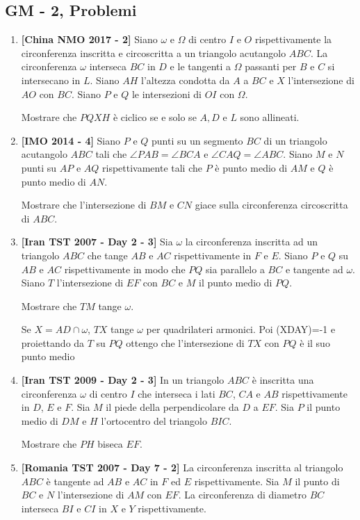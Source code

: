 \subsection{GM - 2, Problemi}
\begin{enumerate}
	\item \textbf{[China NMO 2017 - 2]} Siano $\omega$ e $\Omega$ di centro $I$ e $O$ rispettivamente la circonferenza inscritta e circoscritta a un triangolo acutangolo
	$ABC$. La circonferenza $\omega$ interseca $BC$ in $D$ e le tangenti a $\Omega$ passanti per $B$ e $C$ si intersecano in $L$.
	Siano $AH$ l'altezza condotta da $A$ a $BC$ e $X$ l'intersezione di $AO$ con $BC$. Siano $P$ e $Q$ le 
	intersezioni di $OI$ con $\Omega$.
	
	Mostrare che $PQXH$ è ciclico se e solo se $A,D$ e $L$ sono allineati.
	\item \textbf{[IMO 2014 - 4]} Siano $P$ e $Q$ punti su un segmento $BC$ di un triangolo acutangolo $ABC$ tali che $\angle PAB = \angle BCA$ e $\angle CAQ=\angle ABC$. Siano $M$ e $N$ punti su $AP$ e $AQ$ rispettivamente tali che $P$ è punto medio di $AM$ e $Q$ è punto medio di $AN$.
	
	Mostrare che l'intersezione di $BM$ e $CN$ giace sulla circonferenza circoscritta di $ABC$.
	
	\item \textbf{[Iran TST 2007 - Day 2 - 3]}
	Sia $\omega$ la circonferenza inscritta ad un triangolo $ABC$ che tange $AB$ e $AC$ rispettivamente in $F$ e $E$. Siano $P$ e $Q$ su $AB$ e $AC$ rispettivamente in modo che $PQ$ sia parallelo a $BC$ e tangente ad $\omega$. Siano $T$ l'intersezione di $EF$ con $BC$ e $M$ il punto medio di $PQ$. 
	
	Mostrare che $TM$ tange $\omega$.
	
	\begin{sol}Se $X=AD\cap \omega$, $TX$ tange $\omega$ per quadrilateri armonici. Poi (XDAY)=-1 e proiettando da $T$ su $PQ$ ottengo che l'intersezione di $TX$
	 con $PQ$ è il suo punto medio
	\end{sol}
	
	\item \textbf{[Iran TST 2009 - Day 2 - 3]}
	In un triangolo $ABC$ è inscritta una circonferenza $\omega$ di centro $I$ che interseca i lati $BC$, $CA$ e $AB$ rispettivamente in $D$, $E$ e $F$. Sia $M$ il piede della perpendicolare da $D$ a $EF$. Sia $P$ il punto medio di $DM$ e $H$ l'ortocentro del triangolo $BIC$.
	
	Mostrare che $PH$ biseca $EF$. 
	\item \textbf{[Romania TST 2007 - Day 7 - 2]}	La circonferenza inscritta al triangolo $ABC$ è tangente 
	ad $AB$ e $AC$ in $F$ ed $E$ rispettivamente. Sia $M$ il punto di $BC$ e $N$ l'intersezione di $AM$ con $EF$. La circonferenza di diametro $BC$ interseca $BI$ e $CI$ in $X$ e $Y$ rispettivamente.
	

\end{enumerate}
